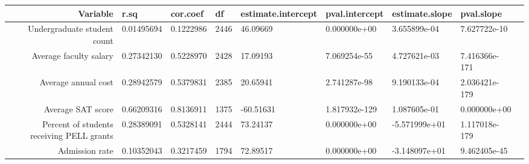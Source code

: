 \documentclass[11pt]{article}
\begin{document}
    \begin{tabular}{r|llllllll}
 Variable & r.sq & cor.coef & df & estimate.intercept & pval.intercept & estimate.slope & pval.slope\\
\hline
	 Undergraduate student count               & 0.01495694                                & 0.1222986                                 & 2446                                      &  46.09669                                 &  0.000000e+00                             &  3.655899e-04                             &  7.627722e-10                            \\
	 Average faculty salary                    & 0.27342130                                & 0.5228970                                 & 2428                                      &  17.09193                                 &  7.069254e-55                             &  4.727621e-03                             & 7.416366e-171                            \\
	 Average annual cost                       & 0.28942579                                & 0.5379831                                 & 2385                                      &  20.65941                                 &  2.741287e-98                             &  9.190133e-04                             & 2.036421e-179                            \\
	 Average SAT score                         & 0.66209316                                & 0.8136911                                 & 1375                                      & -60.51631                                 & 1.817932e-129                             &  1.087605e-01                             &  0.000000e+00                            \\
	 Percent of students receiving PELL grants & 0.28389091                                & 0.5328141                                 & 2444                                      &  73.24137                                 &  0.000000e+00                             & -5.571999e+01                             & 1.117018e-179                            \\
	 Admission rate                            & 0.10352043                                & 0.3217459                                 & 1794                                      &  72.89517                                 &  0.000000e+00                             & -3.148097e+01                             &  9.462405e-45                            \\
\end{tabular}
\end{document}
